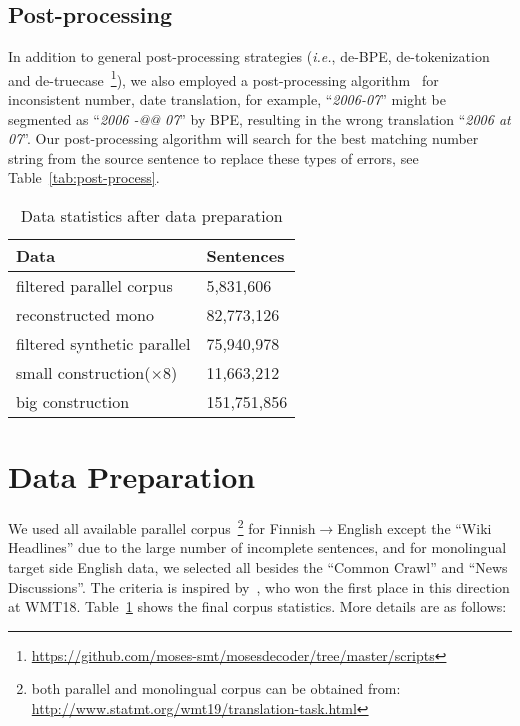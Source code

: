 \documentclass[11pt,a4paper]{article}
\begin{document}
\subsection{Post-processing}
\label{ssec:post}


In addition to general post-processing strategies (\textit{i.e.}, de-BPE, de-tokenization and de-truecase~\footnote{\url{https://github.com/moses-smt/mosesdecoder/tree/master/scripts}}), we also employed a post-processing algorithm~\cite{wang-etal-2018-niutrans} for inconsistent number, date translation, for example, ``\textit{2006-07}'' might be segmented as ``\textit{2006 -@@ 07}'' by BPE, resulting in the wrong translation ``\textit{2006 at 07}''. Our post-processing algorithm will search for the best matching number string from the source sentence to replace these types of errors, see Table~\ref{tab:post-process}.

\begin{table}
    \begin{center}
    \begin{tabular}{|l|l|}
    \hline
    \textbf{Data} & \textbf{Sentences}\\ 
    \hline
    filtered parallel corpus& 5,831,606\\ 
    reconstructed mono & 82,773,126\\
    filtered synthetic parallel & 75,940,978\\
    \hline
    small construction(\small{$\times8$}) & 11,663,212\\
    big construction & 151,751,856\\
    \hline
    \end{tabular}
    \end{center}
    \caption{\label{tab:statics}Data statistics after data preparation}
\end{table}

\section{Data Preparation}
\label{sec:data}
We used all available parallel corpus~\footnote{both parallel and monolingual corpus can be obtained from: \url{http://www.statmt.org/wmt19/translation-task.html}} for Finnish$\rightarrow$English except the ``Wiki Headlines'' due to the large number of incomplete sentences, and for monolingual target side English data, we selected all besides the ``Common Crawl'' and ``News Discussions''. The criteria is inspired by~\cite{marie-etal-2018-nicts}, who won the first place in this direction at WMT18. Table~\ref{tab:statics} shows the final corpus statistics. More details are as follows:\\
\end{document}
